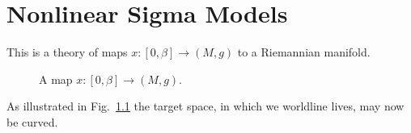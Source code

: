 
\chapter{Nonlinear Sigma Models}%
\label{cha:nonlinear_sigma_models}

This is a theory of maps $x \colon [0, \beta] \to (M, g)$  to a Riemannian manifold.
\begin{figure}[tbhp]
  \centering
  \def\svgwidth{0.5\columnwidth}
  
  \caption{A map $x\colon [0, \beta] \to (M, g)$.}
  \label{fig:l9f1}
\end{figure}
As illustrated in Fig.~\ref{fig:l9f1} the target space, in which we worldline lives, may now be curved.

